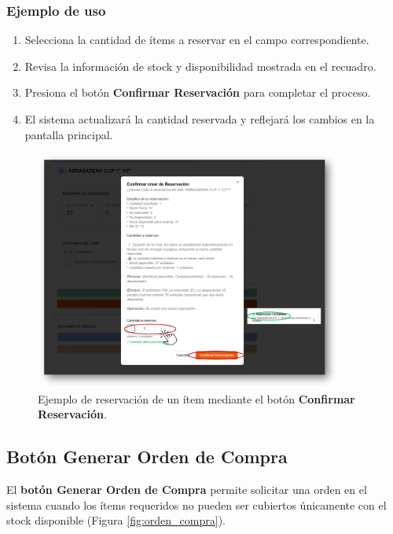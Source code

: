 \subsubsection*{Ejemplo de uso}
\begin{enumerate}
    \item Selecciona la cantidad de ítems a reservar en el campo correspondiente.
    \item Revisa la información de stock y disponibilidad mostrada en el recuadro.
    \item Presiona el botón \textbf{Confirmar Reservación} para completar el proceso.
    \item El sistema actualizará la cantidad reservada y reflejará los cambios en la pantalla principal.
\end{enumerate}

\begin{figure}[H]
    \centering
    \includegraphics[width=0.9\textwidth]{imgs/Almacen_General/Procesamiento_SM/reservacion_items.png}
    \caption{Ejemplo de reservación de un ítem mediante el botón \textbf{Confirmar Reservación}.}
    \label{fig:ejemplo_reservacion}
\end{figure}


\subsection{Botón Generar Orden de Compra}

\vspace{-0.2em} %

El \textbf{botón Generar Orden de Compra} permite solicitar una orden en el sistema cuando los ítems requeridos no pueden ser cubiertos únicamente con el stock disponible (Figura \ref{fig:orden_compra}).  

